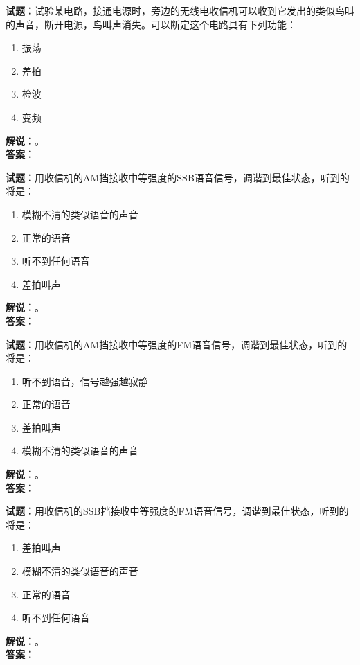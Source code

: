 \documentclass{ctexbook}
\begin{document}
\bigskip




\noindent\textbf{试题：}试验某电路，接通电源时，旁边的无线电收信机可以收到它发出的类似鸟叫的声音，断开电源，鸟叫声消失。可以断定这个电路具有下列功能：
\begin{enumerate}[leftmargin=3em]
\item 振荡
\item 差拍
\item 检波
\item 变频
\end{enumerate}
\noindent\textbf{解说：}\textbf{}。\\\noindent\textbf{答案：}

\bigskip




\noindent\textbf{试题：}用收信机的AM挡接收中等强度的SSB语音信号，调谐到最佳状态，听到的将是：
\begin{enumerate}[leftmargin=3em]
\item 模糊不清的类似语音的声音
\item 正常的语音
\item 听不到任何语音
\item 差拍叫声
\end{enumerate}
\noindent\textbf{解说：}\textbf{}。\\\noindent\textbf{答案：}

\bigskip




\noindent\textbf{试题：}用收信机的AM挡接收中等强度的FM语音信号，调谐到最佳状态，听到的将是：
\begin{enumerate}[leftmargin=3em]
\item 听不到语音，信号越强越寂静
\item 正常的语音
\item 差拍叫声
\item 模糊不清的类似语音的声音
\end{enumerate}
\noindent\textbf{解说：}\textbf{}。\\\noindent\textbf{答案：}

\bigskip




\noindent\textbf{试题：}用收信机的SSB挡接收中等强度的FM语音信号，调谐到最佳状态，听到的将是：
\begin{enumerate}[leftmargin=3em]
\item 差拍叫声
\item 模糊不清的类似语音的声音
\item 正常的语音
\item 听不到任何语音
\end{enumerate}
\noindent\textbf{解说：}\textbf{}。\\\noindent\textbf{答案：}
\end{document}
